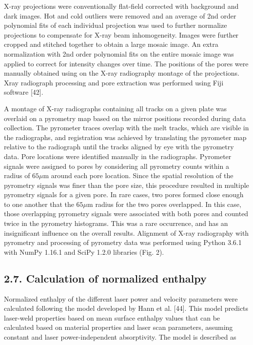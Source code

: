 \documentclass[10pt]{article}
\begin{document}
X-ray projections were conventionally flat-field corrected with background and dark images. Hot and cold outliers were removed and an average of 2nd order polynomial fits of each individual projection was used to further normalize projections to compensate for X-ray beam inhomogeneity. Images were further cropped and stitched together to obtain a large mosaic image. An extra normalization with 2nd order polynomial fits on the entire mosaic image was applied to correct for intensity changes over time. The positions of the pores were manually obtained using on the X-ray radiography montage of the projections. Xray radiograph processing and pore extraction was performed using Fiji software [42].

A montage of X-ray radiographs containing all tracks on a given plate was overlaid on a pyrometry map based on the mirror positions recorded during data collection. The pyrometer traces overlap with the melt tracks, which are visible in the radiographs, and registration was achieved by translating the pyrometer map relative to the radiograph until the tracks aligned by eye with the pyrometry data. Pore locations were identified manually in the radiographs. Pyrometer signals were assigned to pores by considering all pyrometry counts within a radius of $65 \mu \mathrm{m}$ around each pore location. Since the spatial resolution of the pyrometry signals was finer than the pore size, this procedure resulted in multiple pyrometry signals for a given pore. In rare cases, two pores formed close enough to one another that the $65 \mu \mathrm{m}$ radius for the two pores overlapped. In this case, those overlapping pyrometry signals were associated with both pores and counted twice in the pyrometry histograms. This was a rare occurrence, and has an insignificant influence on the overall results. Alignment of X-ray radiography with pyrometry and processing of pyrometry data was performed using Python 3.6.1 with NumPy 1.16.1 and SciPy 1.2.0 libraries (Fig. 2).

\subsection*{2.7. Calculation of normalized enthalpy}
Normalized enthalpy of the different laser power and velocity parameters were calculated following the model developed by Hann et al. [44]. This model predicts laser-weld properties based on mean surface enthalpy values that can be calculated based on material properties and laser scan parameters, assuming constant and laser power-independent absorptivity. The model is described as
\end{document}
